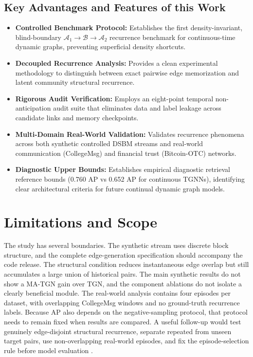 \documentclass[conference]{IEEEtran}
\begin{document}
\subsection*{Key Advantages and Features of this Work}
\begin{itemize}
    \item \textbf{Controlled Benchmark Protocol:} Establishes the first density-invariant, blind-boundary $\mathcal{A}_1 \to \mathcal{B} \to \mathcal{A}_2$ recurrence benchmark for continuous-time dynamic graphs, preventing superficial density shortcuts.
    \item \textbf{Decoupled Recurrence Analysis:} Provides a clean experimental methodology to distinguish between exact pairwise edge memorization and latent community structural recurrence.
    \item \textbf{Rigorous Audit Verification:} Employs an eight-point temporal non-anticipation audit suite that eliminates data and label leakage across candidate links and memory checkpoints.
    \item \textbf{Multi-Domain Real-World Validation:} Validates recurrence phenomena across both synthetic controlled DSBM streams and real-world communication (CollegeMsg) and financial trust (Bitcoin-OTC) networks.
    \item \textbf{Diagnostic Upper Bounds:} Establishes empirical diagnostic retrieval reference bounds (0.760 AP vs 0.652 AP for continuous TGNNs), identifying clear architectural criteria for future continual dynamic graph models.
\end{itemize}

\section{Limitations and Scope}
The study has several boundaries. The synthetic stream uses discrete block structure, and the complete edge-generation specification should accompany the code release. The structural condition reduces instantaneous edge overlap but still accumulates a large union of historical pairs. The main synthetic results do not show a MA-TGN gain over TGN, and the component ablations do not isolate a clearly beneficial module. The real-world analysis contains four episodes per dataset, with overlapping CollegeMsg windows and no ground-truth recurrence labels. Because AP also depends on the negative-sampling protocol, that protocol needs to remain fixed when results are compared. A useful follow-up would test genuinely edge-disjoint structural recurrence, separate repeated from unseen target pairs, use non-overlapping real-world episodes, and fix the episode-selection rule before model evaluation \cite{chen2025towards, zhao2025lifelong, liu2025continual}.
\end{document}
